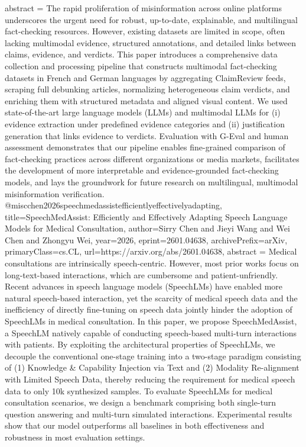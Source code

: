 {      abstract = {The rapid proliferation of misinformation across online platforms underscores the urgent need for robust, up-to-date, explainable, and multilingual fact-checking resources. However, existing datasets are limited in scope, often lacking multimodal evidence, structured annotations, and detailed links between claims, evidence, and verdicts. This paper introduces a comprehensive data collection and processing pipeline that constructs multimodal fact-checking datasets in French and German languages by aggregating ClaimReview feeds, scraping full debunking articles, normalizing heterogeneous claim verdicts, and enriching them with structured metadata and aligned visual content. We used state-of-the-art large language models (LLMs) and multimodal LLMs for (i) evidence extraction under predefined evidence categories and (ii) justification generation that links evidence to verdicts. Evaluation with G-Eval and human assessment demonstrates that our pipeline enables fine-grained comparison of fact-checking practices across different organizations or media markets, facilitates the development of more interpretable and evidence-grounded fact-checking models, and lays the groundwork for future research on multilingual, multimodal misinformation verification.}
}@misc{chen2026speechmedassistefficientlyeffectivelyadapting,
      title={SpeechMedAssist: Efficiently and Effectively Adapting Speech Language Models for Medical Consultation}, 
      author={Sirry Chen and Jieyi Wang and Wei Chen and Zhongyu Wei},
      year={2026},
      eprint={2601.04638},
      archivePrefix={arXiv},
      primaryClass={cs.CL},
      url={https://arxiv.org/abs/2601.04638},
      abstract = {Medical consultations are intrinsically speech-centric. However, most prior works focus on long-text-based interactions, which are cumbersome and patient-unfriendly. Recent advances in speech language models (SpeechLMs) have enabled more natural speech-based interaction, yet the scarcity of medical speech data and the inefficiency of directly fine-tuning on speech data jointly hinder the adoption of SpeechLMs in medical consultation. In this paper, we propose SpeechMedAssist, a SpeechLM natively capable of conducting speech-based multi-turn interactions with patients. By exploiting the architectural properties of SpeechLMs, we decouple the conventional one-stage training into a two-stage paradigm consisting of (1) Knowledge & Capability Injection via Text and (2) Modality Re-alignment with Limited Speech Data, thereby reducing the requirement for medical speech data to only 10k synthesized samples. To evaluate SpeechLMs for medical consultation scenarios, we design a benchmark comprising both single-turn question answering and multi-turn simulated interactions. Experimental results show that our model outperforms all baselines in both effectiveness and robustness in most evaluation settings.}
}
